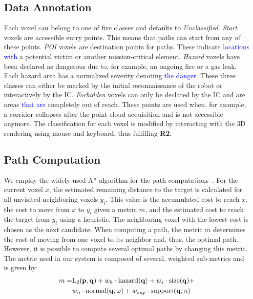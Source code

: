 \documentclass{egpubl}
\newcommand{\diff}[1]{\textcolor{blue}{#1}}
\begin{document}
\subsection{Data Annotation} \label{sec:overview:annotation}
Each voxel can belong to one of five classes and defaults to \emph{Unclassified}. \emph{Start} voxels are accessible entry points. This means that paths can start from any of these points. \emph{POI} voxels are destination points for paths. These indicate \diff{locations with} a potential victim or another mission-critical element. \emph{Hazard} voxels have been declared as dangerous due to, for example, an ongoing fire or a gas leak. Each hazard area has a normalized severity denoting \diff{the danger}. These three classes can either be marked by the initial reconnaissance of the robot or interactively by the IC. \emph{Forbidden} voxels can only be declared by the IC and are areas \diff{that are} completely out of reach. These points are used when, for example, a corridor collapses after the point cloud acquisition and is not accessible anymore. The classification for each voxel is modified by interacting with the 3D rendering using mouse and keyboard, thus fulfilling {\bfseries R2}. 

\subsection{Path Computation} \label{sec:overview:pathcomputation}
We employ the widely used A* algorithm for the path computations~\cite{4082128}. For the current voxel $x$, the estimated remaining distance to the target is calculated for all unvisited neighboring voxels $y_i$. This value is the accumulated cost to reach $x$, the cost to move from $x$ to $y_i$ given a metric $m$, and the estimated cost to reach the target from $y_i$ using a heuristic. The neighboring voxel with the lowest cost is chosen as the next candidate. When computing a path, the metric $m$ determines the cost of moving from one voxel to its neighbor and, thus, the optimal path. However, it is possible to compute several optimal paths by changing this metric. The metric used in our system is composed of several, weighted sub-metrics and is given by:
%
\begin{equation}
\begin{array}{r@{}l}
m = & \textrm{L}_2(\mathbf{p},\mathbf{q}) + w_h \cdot \textrm{hazard}(\mathbf{q}) + w_s \cdot \textrm{size}(\mathbf{q}) + \vspace*{0.1cm} \\
  & w_n \cdot \textrm{normal}(\mathbf{q},\varphi) + w_{sup} \cdot \textrm{support}(\mathbf{q},n)
\end{array}
\label{eqn:metric}
\end{equation}
\end{document}

